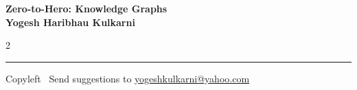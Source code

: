 \documentclass[8pt,landscape]{article}
\begin{document}
\footnotesize


\begin{center}
\Large{\textbf{Zero-to-Hero: Knowledge Graphs\\ Yogesh Haribhau Kulkarni}}  
\end{center}

\begin{multicols}{2}


\end{multicols}

\rule{\linewidth}{0.25pt}
\scriptsize
Copyleft \textcopyleft\  Send suggestions to 
\href{http://www.yogeshkulkarni.com}{yogeshkulkarni@yahoo.com}
\end{document}

